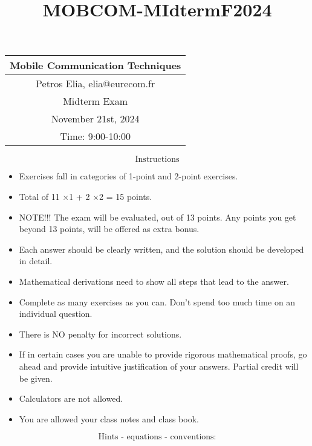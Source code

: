 \documentclass[11pt]{article}
\title{MOBCOM-MIdtermF2024}
\begin{document}
    
    \maketitle
    
    

    
    \begin{longtable}[]{@{}c@{}}
\toprule\noalign{}
Mobile Communication Techniques \\
\midrule\noalign{}
\endhead
\bottomrule\noalign{}
\endlastfoot
Petros Elia, elia@eurecom.fr \\
Midterm Exam \\
November 21st, 2024 \\
Time: 9:00-10:00 \\
\end{longtable}

    \[\text{Instructions}\]

\begin{itemize}
\item
  Exercises fall in categories of 1-point and 2-point exercises.
\item
  Total of 11 ×1 + 2 ×2 = 15 points.
\item
  NOTE!!! The exam will be evaluated, out of 13 points. Any points you
  get beyond 13 points, will be offered as extra bonus.
\item
  Each answer should be clearly written, and the solution should be
  developed in detail.
\item
  Mathematical derivations need to show all steps that lead to the
  answer.
\item
  Complete as many exercises as you can. Don't spend too much time on an
  individual question.
\item
  There is NO penalty for incorrect solutions.
\item
  If in certain cases you are unable to provide rigorous mathematical
  proofs, go ahead and provide intuitive justification of your answers.
  Partial credit will be given.
\item
  Calculators are not allowed.
\item
  You are allowed your class notes and class book.
\end{itemize}

\[\text{Hints - equations - conventions:}\]
\end{document}

